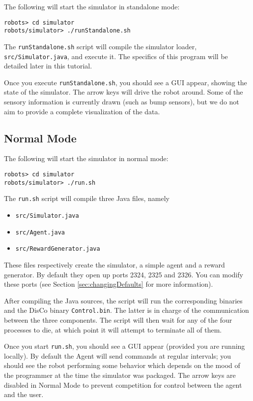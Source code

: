 \documentclass[12pt]{article}
\begin{document}
The following will start the simulator in standalone mode:

\begin{verbatim}
robots> cd simulator 
robots/simulator> ./runStandalone.sh
\end{verbatim}

The \verb+runStandalone.sh+ script will compile the simulator loader,
\verb+src/Simulator.java+, and execute it. The specifics of this program will 
be detailed later in this tutorial.

Once you execute \verb+runStandalone.sh+, you should see a GUI appear, showing
the state of the simulator. The arrow keys will drive the robot around. Some 
of the
sensory information is currently drawn (such as bump sensors), but we do not
aim to provide a complete visualization of the data.

\subsection{Normal Mode}

The following will start the simulator in normal mode:

\begin{verbatim}
robots> cd simulator 
robots/simulator> ./run.sh
\end{verbatim}

The \verb+run.sh+ script will compile three Java files, namely

\begin{itemize}
\item{\verb+src/Simulator.java+}
\item{\verb+src/Agent.java+}
\item{\verb+src/RewardGenerator.java+}
\end{itemize}

These files respectively create the simulator, a simple agent and a reward
generator. By default they open up ports 2324, 2325 and 2326. You can modify
these ports (see Section \ref{sec:changingDefaults} for more information).

After compiling the Java sources, the script will run the corresponding
binaries and the DisCo binary \verb+Control.bin+. The latter is in charge
of the communication between the three components. The script will then wait
for any of the four processes to die, at which point it will attempt to 
terminate all of them.

Once you start \verb+run.sh+, you should see a GUI appear (provided you are
running locally). By default the Agent will send commands at regular intervals;
you should see the robot performing some behavior which depends on the mood
of the programmer at the time the simulator was packaged. The arrow keys are
disabled in Normal Mode to prevent competition for control between the agent
and the user. 
\end{document}
